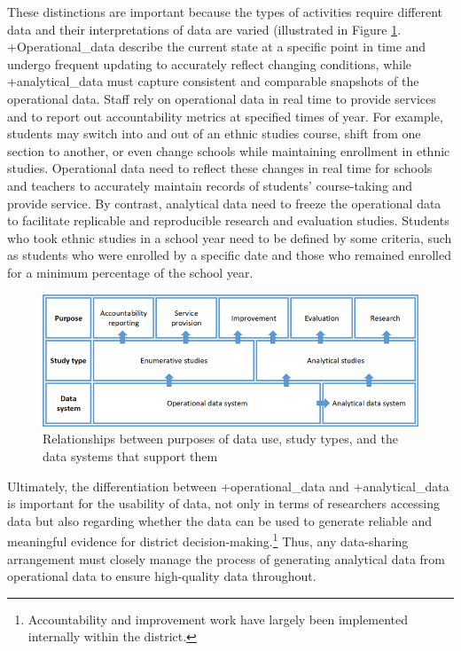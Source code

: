 \documentclass[
]{WileySix}
\begin{document}
These distinctions are important because the types of activities require different data and their interpretations of data are varied (illustrated in Figure \ref{fig:sfusdfigure1}. +Operational\_data\textbar{} describe the current state at a specific point in time and undergo frequent updating to accurately reflect changing conditions, while +analytical\_data\textbar{} must capture consistent and comparable snapshots of the operational data. Staff rely on operational data in real time to provide services and to report out accountability metrics at specified times of year. For example, students may switch into and out of an ethnic studies course, shift from one section to another, or even change schools while maintaining enrollment in ethnic studies. Operational data need to reflect these changes in real time for schools and teachers to accurately maintain records of students' course-taking and provide service. By contrast, analytical data need to freeze the operational data to facilitate replicable and reproducible research and evaluation studies. Students who took ethnic studies in a school year need to be defined by some criteria, such as students who were enrolled by a specific date and those who remained enrolled for a minimum percentage of the school year.

\begin{figure}
\includegraphics[width=1\linewidth]{./assets/sfusd/sfusdfigure1web} \caption{Relationships between purposes of data use, study types, and the data systems that support them}\label{fig:sfusdfigure1}
\end{figure}

Ultimately, the differentiation between +operational\_data\textbar{} and +analytical\_data\textbar{} is important for the usability of data, not only in terms of researchers accessing data but also regarding whether the data can be used to generate reliable and meaningful evidence for district decision-making.\footnote{Accountability and improvement work have largely been implemented internally within the district.} Thus, any data-sharing arrangement must closely manage the process of generating analytical data from operational data to ensure high-quality data throughout.
\end{document}
